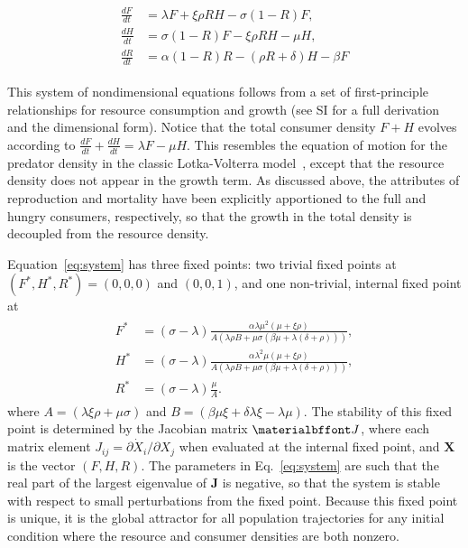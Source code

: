 \documentclass{pnastwo}
\begin{document}
\begin{article}
\begin{align}
\label{eq:system}
\begin{split}
\frac{dF}{dt} &= \lambda F + \xi \rho RH - \sigma \left(1-R\right)F,  \\
\frac{dH}{dt} &= \sigma \left(1-R\right)F - \xi \rho RH - \mu H,  \\
\frac{dR}{dt} &= \alpha \left(1-R\right)R -\left(\rho R+\delta\right)H-\beta F
\end{split}
\end{align}

This system of nondimensional equations follows from a set of first-principle relationships for resource consumption and growth (see SI for a full derivation and the dimensional form).
Notice that the total consumer density $F+H$ evolves according to $\frac{dF}{dt}+\frac{dH}{dt}=\lambda F-\mu H$.
This resembles the equation of motion for the predator density in the classic Lotka-Volterra model~\cite{murray2011mathematical}, except that the resource density does not appear in the growth term.
As discussed above, the attributes of reproduction and mortality have been explicitly apportioned to the full and hungry consumers, respectively, so that the growth in the total density is decoupled from the resource density.

Equation~\eqref{eq:system} has three fixed points: two trivial fixed points at $(F^*,H^*,R^*)=(0,0,0)$ and $(0,0,1)$, and one non-trivial, internal fixed point at
\begin{align}
\label{eq:ss}
\begin{split}
F^* &= (\sigma-\lambda)\frac{ \alpha  \lambda  \mu ^2  (\mu +\xi  \rho )}{A (\lambda  \rho  B+\mu  \sigma  (\beta  \mu +\lambda  (\delta +\rho )))}, \\
H^* &= (\sigma-\lambda)\frac{ \alpha  \lambda ^2 \mu  (\mu +\xi  \rho )}{A (\lambda  \rho  B+\mu  \sigma  (\beta  \mu +\lambda  (\delta +\rho )))}, \\
R^* &= (\sigma - \lambda)\frac{\mu  }{A}.
\end{split}
\end{align}
where $A=(\lambda  \xi  \rho +\mu  \sigma )$ and $B=(\beta  \mu  \xi +\delta  \lambda  \xi -\lambda  \mu )$. The stability of this fixed point is determined by the Jacobian matrix $\bf J$, where each matrix element $J_{ij}=\partial{\dot X_i}/\partial{X_j}$ when evaluated at the internal fixed point, and $\mathbf{X}$ is the vector $(F,H,R)$.
The parameters in Eq.~\eqref{eq:system} are such that the real part of the largest eigenvalue of $\mathbf{J}$ is negative, so that the system is stable with respect to small perturbations from the fixed point.
Because this fixed point is unique, it is the global attractor for all population trajectories for any initial condition where the resource and consumer densities are both nonzero.





\end{article}
\end{document}
